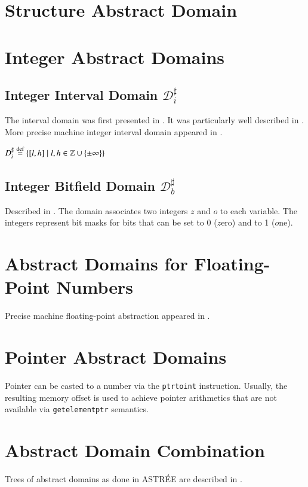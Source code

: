 \documentclass[a4paper]{book}
\begin{document}
\chapter{Structure Abstract Domain}

\chapter{Integer Abstract Domains}

\section{Integer Interval Domain $\mathcal{D}_i^\sharp$}

The interval domain was first presented in \cite{CC76}.  It was
particularly well described in \cite{M04}. More precise machine
integer interval domain appeared in \cite{M12}.

$D_i^\sharp \buildrel \text{d{}ef}\over = \{ [ l,h ] \mid l, h \in
\mathbb{Z} \cup \{ \pm\infty \} \}$

\section{Integer Bitfield Domain $\mathcal{D}_b^\sharp$}

Described in \cite{M12}.  The domain associates two integers $z$ and
$o$ to each variable. The integers represent bit masks for bits that
can be set to 0 ($z$ero) and to 1 ($o$ne).

\chapter{Abstract Domains for Floating-Point Numbers}
Precise machine floating-point abstraction appeared in \cite{M12}.

\chapter{Pointer Abstract Domains}
Pointer can be casted to a number via the \texttt{ptrtoint}
instruction.  Usually, the resulting memory offset is used to achieve
pointer arithmetics that are not available via \texttt{getelementptr}
semantics.

\chapter{Abstract Domain Combination}

Trees of abstract domains as done in ASTRÉE are described in
\cite{CCFMMMR06}.
\end{document}
